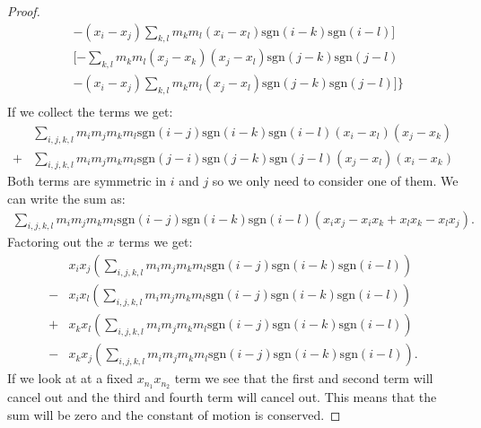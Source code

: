 \documentclass[english,master]{liumaiex}
\theoremstyle{plain}
\theoremstyle{definition}
\newcommand{\sgn}{\text{sgn}}
\begin{document}
\begin{proof}
\begin{equation}
\begin{aligned}
			&-(x_i - x_j)\sum_{k,l} m_k m_l (x_i - x_l) \sgn(i - k) \sgn(i - l)]\\
			&[-\sum_{k,l} m_k m_l (x_j - x_k) (x_j - x_l) \sgn(j - k) \sgn(j - l)\\
			&-(x_i - x_j)\sum_{k,l} m_k m_l (x_j - x_l) \sgn(j - k) \sgn(j - l)]\}\\
	\end{aligned}
	\end{equation}
	If we collect the terms we get:
	\begin{align}
		&\sum_{i,j,k,l} m_i m_j m_k m_l \sgn(i - j) \sgn(i - k) \sgn(i - l) (x_i - x_l) (x_j - x_k)\\ 
		+&\sum_{i,j,k,l} m_i m_j m_k m_l \sgn(j - i) \sgn(j - k) \sgn(j - l) (x_j - x_l) (x_i - x_k) 
	\end{align}
	Both terms are symmetric in $i$ and $j$ so we only need to consider one of them. We can write the sum as:
	\begin{align}
		\sum_{i,j,k,l} m_i m_j m_k m_l \sgn(i - j) \sgn(i - k) \sgn(i - l) (x_i x_j - x_i x_k + x_l x_k - x_l x_j).
	\end{align}
	Factoring out the $x$ terms we get:
	\begin{align}
		&x_i x_j (\sum_{i,j,k,l} m_i m_j m_k m_l \sgn(i - j) \sgn(i - k) \sgn(i - l))\\
		- &x_i x_l (\sum_{i,j,k,l} m_i m_j m_k m_l \sgn(i - j) \sgn(i - k) \sgn(i - l))\\
		+ &x_k x_l (\sum_{i,j,k,l} m_i m_j m_k m_l \sgn(i - j) \sgn(i - k) \sgn(i - l))\\
		- &x_k x_j (\sum_{i,j,k,l} m_i m_j m_k m_l \sgn(i - j) \sgn(i - k) \sgn(i - l)).
	\end{align}
	If we look at at a fixed $x_{n_1}x_{n_2}$ term we see that the first and second term will cancel out and the third and fourth term will cancel out. This means that the sum will be zero and the constant of motion is conserved.
\end{proof}
\end{document}
